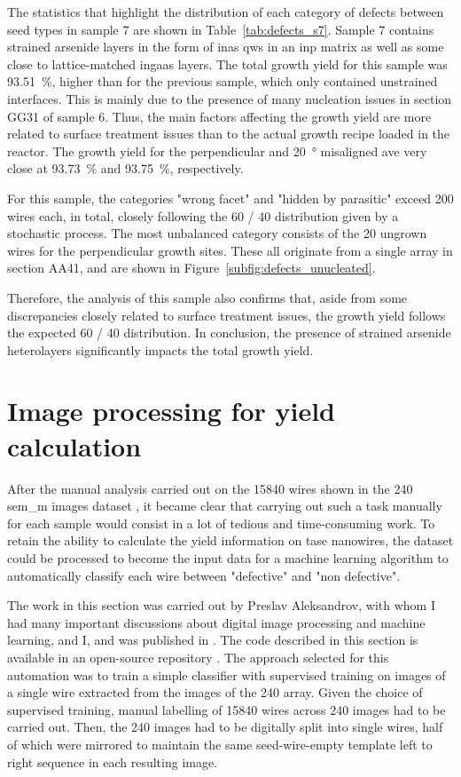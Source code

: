 The statistics that highlight the distribution of each category of defects between seed types in sample 7 are shown in Table~\ref{tab:defects_s7}. Sample 7 contains strained arsenide layers in the form of \acs{inas} \acl{qw}s in an \acs{inp} matrix as well as some close to lattice-matched \acs{ingaas} layers. The total growth yield for this sample was \qty{93.51}{\%}, higher than for the previous sample, which only contained unstrained interfaces. This is mainly due to the presence of many nucleation issues in section GG31 of sample 6. Thus, the main factors affecting the growth yield are more related to surface treatment issues than to the actual growth recipe loaded in the reactor. The growth yield for the perpendicular and \qty{20}{\degree} misaligned ave very close at \qty{93.73}{\%} and \qty{93.75}{\%}, respectively.

For this sample, the categories "wrong facet" and "hidden by parasitic" exceed 200 wires each, in total, closely following the \num{60} / \num{40} distribution given by a stochastic process. The most unbalanced category consists of the \num{20} ungrown wires for the perpendicular growth sites. These all originate from a single array in section AA41, and are shown in Figure~\ref{subfig:defects_unucleated}.

Therefore, the analysis of this sample also confirms that, aside from some discrepancies closely related to surface treatment issues, the growth yield follows the expected \num{60} / \num{40} distribution. In conclusion, the presence of strained arsenide heterolayers significantly impacts the total growth yield.

\section{Image processing for yield calculation}

After the manual analysis carried out on the \num{15840} wires shown in the \num{240} \acs{sem_m} images dataset \cite{dataset}, it became clear that carrying out such a task manually for each sample would consist in a lot of tedious and time-consuming work. To retain the ability to calculate the yield information on \acs{tase} nanowires, the dataset could be processed to become the input data for a machine learning algorithm to automatically classify each wire between "defective" and "non defective". 

The work in this section was carried out by Preslav Aleksandrov, with whom I had many important discussions about digital image processing and machine learning, and I, and was published in \cite{Brugnolotto2024}. The code described in this section is available in an open-source repository \cite{code}. The approach selected for this automation was to train a simple classifier with supervised training on images of a single wire extracted from the images of the \num{240} array. Given the choice of supervised training, manual labelling of \num{15840} wires across 240 images had to be carried out. Then, the 240 images had to be digitally split into single wires, half of which were mirrored to maintain the same seed-wire-empty template left to right sequence in each resulting image.

